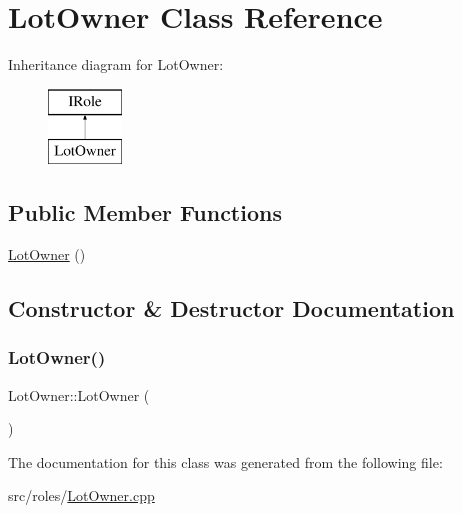 \hypertarget{class_lot_owner}{}\section{Lot\+Owner Class Reference}
\label{class_lot_owner}
Inheritance diagram for Lot\+Owner\+:\begin{figure}[H]
\begin{center}
\leavevmode
\includegraphics[height=2.000000cm]{class_lot_owner}
\end{center}
\end{figure}
\subsection*{Public Member Functions}
\begin{DoxyCompactItemize}
\item 
\mbox{\hyperlink{class_lot_owner_abfcd750c30d86376ba8b2efb3c9d40d9}{Lot\+Owner}} ()
\end{DoxyCompactItemize}


\subsection{Constructor \& Destructor Documentation}
\mbox{\label{class_lot_owner_abfcd750c30d86376ba8b2efb3c9d40d9}} 
\subsubsection{\texorpdfstring{Lot\+Owner()}{LotOwner()}}
{\footnotesize\ttfamily Lot\+Owner\+::\+Lot\+Owner (\begin{DoxyParamCaption}{ }\end{DoxyParamCaption})\hspace{0.3cm}{\ttfamily [inline]}}



The documentation for this class was generated from the following file\+:\begin{DoxyCompactItemize}
\item 
src/roles/\mbox{\hyperlink{_lot_owner_8cpp}{Lot\+Owner.\+cpp}}\end{DoxyCompactItemize}
